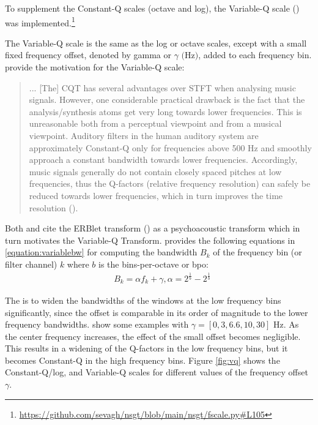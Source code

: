 \documentclass[report.tex]{subfiles}
\begin{document}
To supplement the Constant-Q scales (octave and log), the Variable-Q scale (\cite{variableq1, variableq2}) was implemented.\footnote{\url{https://github.com/sevagh/nsgt/blob/main/nsgt/fscale.py\#L105}}

The Variable-Q scale is the same as the log or octave scales, except with a small fixed frequency offset, denoted by gamma or $\gamma \text{ (Hz)}$, added to each frequency bin. \citeauthor{variableq1} provide the motivation for the Variable-Q scale:
\begin{quote}
	... [The] CQT has several advantages over STFT when analysing music signals. However, one considerable practical drawback is the fact that the analysis/synthesis atoms get very long towards lower frequencies. This is unreasonable both from a perceptual viewpoint and from a musical viewpoint. Auditory filters in the human auditory system are approximately Constant-Q only for frequencies above 500 Hz and smoothly approach a constant bandwidth towards lower frequencies. Accordingly, music signals generally do not contain closely spaced pitches at low frequencies, thus the Q-factors (relative frequency resolution) can safely be reduced towards lower frequencies, which in turn improves the time resolution (\cite[5]{variableq1}).
\end{quote}

Both \textcite{variableq1} and \textcite{variableq2} cite the ERBlet transform (\cite{erblet}) as a psychoacoustic transform which in turn motivates the Variable-Q Transform. \textcite{variableq1, variableq2} provides the following equations in \eqref{equation:variablebw} for computing the bandwidth $B_{k}$ of the frequency bin (or filter channel) $k$ where $b$ is the bins-per-octave or bpo:
\begin{align}\tag{5}\label{equation:variablebw}
	\nonumber & B_{k} = \alpha f_{k} + \gamma, \alpha = 2^{\frac{1}{b}} - 2^{\frac{1}{b}}
\end{align}

The is to widen the bandwidths of the windows at the low frequency bins significantly, since the offset is comparable in its order of magnitude to the lower frequency bandwidths. \textcite{variableq1} show some examples with $\gamma = [0, 3, 6.6, 10, 30] \text{ Hz}$. As the center frequency increases, the effect of the small offset becomes negligible. This results in a widening of the Q-factors in the low frequency bins, but it becomes Constant-Q in the high frequency bins. Figure \ref{fig:vq} shows the Constant-Q/log, and Variable-Q scales for different values of the frequency offset $\gamma$.
\end{document}

